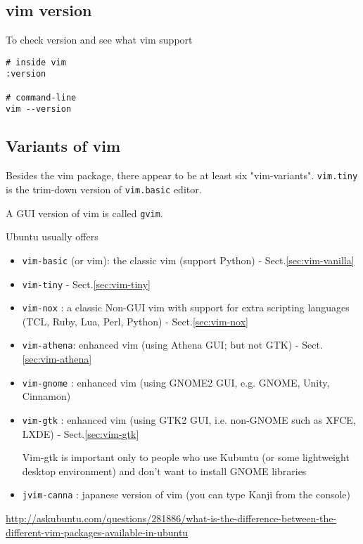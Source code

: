 \subsection{vim version}
\label{sec:vim-version}

To check version and see what vim support
\begin{verbatim}
# inside vim
:version

# command-line
vim --version
\end{verbatim}

\subsection{Variants of vim}
\label{sec:vim_variants}

Besides the vim package, there appear to be at least six "vim-variants".
\verb!vim.tiny! is the trim-down version of \verb!vim.basic! editor.

A GUI version of vim is called \verb!gvim!. 

Ubuntu usually offers
\begin{itemize}
  \item \verb!vim-basic! (or vim): the classic vim (support Python) -
  Sect.\ref{sec:vim-vanilla}
  
  \item \verb!vim-tiny! - Sect.\ref{sec:vim-tiny}
  
  \item \verb!vim-nox! :  a classic Non-GUI vim with support for extra scripting
  languages (TCL, Ruby, Lua, Perl, Python) - Sect.\ref{sec:vim-nox}
    
  \item \verb!vim-athena!: enhanced vim (using Athena GUI; but not GTK) -
  Sect.\ref{sec:vim-athena}

  \item \verb!vim-gnome! : enhanced vim (using GNOME2 GUI, e.g. GNOME, Unity,
  Cinnamon)
   
  \item \verb!vim-gtk! : enhanced vim (using GTK2 GUI, i.e. non-GNOME such as
  XFCE, LXDE) - Sect.\ref{sec:vim-gtk}
  
  Vim-gtk is important only to people who use Kubuntu (or some lightweight
  desktop environment) and don't want to install GNOME libraries
  
  \item \verb!jvim-canna! : japanese version of vim (you can type Kanji from the console)
  
  
\end{itemize}
\url{http://askubuntu.com/questions/281886/what-is-the-difference-between-the-different-vim-packages-available-in-ubuntu}


